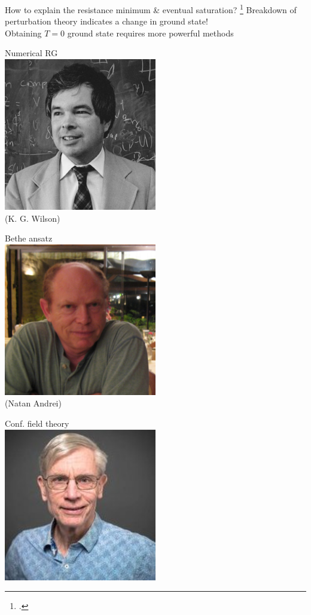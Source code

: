 \documentclass[aspectratio=169]{beamer}
\begin{document}
\begin{frame}{How to explain the resistance minimum \& eventual saturation?}
\footcite{wilson1975,andrei_1980,Wiegmann_1981,affleck1995conformal}
Breakdown of perturbation theory indicates a \alert{change in ground state}!\\[10pt]
Obtaining \(T=0\) ground state requires more \alert{powerful  methods}\\[10pt]

\begin{minipage}{0.2\textwidth}
\centering
Numerical RG\\[10pt]
\includegraphics[width=0.5\textwidth]{wilson.jpg}\\
\footnotesize{(K. G. Wilson)}
\end{minipage}
\begin{minipage}{0.2\textwidth}
\centering
Bethe ansatz\\[10pt]
\includegraphics[width=0.5\textwidth]{AndreiN.jpg}\\
\footnotesize{(Natan Andrei)}
\end{minipage}
\begin{minipage}{0.2\textwidth}
\centering
Conf. field theory\\[10pt]
\includegraphics[width=0.5\textwidth]{affleck.jpg}\\

\end{minipage}
\end{frame}
\end{document}
